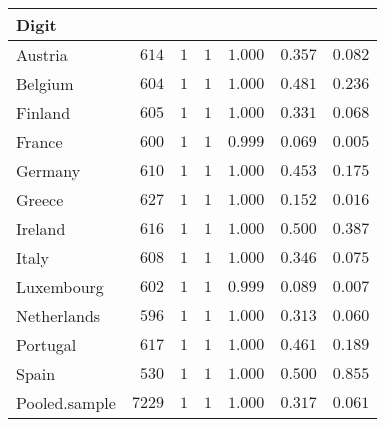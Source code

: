 \begin{table}[!tbp]
\begin{center}
\begin{tabular}{lrrrrrr}
\hline\hline
\multicolumn{1}{l}{Digit}&\multicolumn{1}{c}{}&\multicolumn{1}{c}{}&\multicolumn{1}{c}{}&\multicolumn{1}{c}{}&\multicolumn{1}{c}{}&\multicolumn{1}{c}{}\tabularnewline
\hline
Austria&$ 614$&$1$&$1$&$1.000$&$0.357$&$0.082$\tabularnewline
Belgium&$ 604$&$1$&$1$&$1.000$&$0.481$&$0.236$\tabularnewline
Finland&$ 605$&$1$&$1$&$1.000$&$0.331$&$0.068$\tabularnewline
France&$ 600$&$1$&$1$&$0.999$&$0.069$&$0.005$\tabularnewline
Germany&$ 610$&$1$&$1$&$1.000$&$0.453$&$0.175$\tabularnewline
Greece&$ 627$&$1$&$1$&$1.000$&$0.152$&$0.016$\tabularnewline
Ireland&$ 616$&$1$&$1$&$1.000$&$0.500$&$0.387$\tabularnewline
Italy&$ 608$&$1$&$1$&$1.000$&$0.346$&$0.075$\tabularnewline
Luxembourg&$ 602$&$1$&$1$&$0.999$&$0.089$&$0.007$\tabularnewline
Netherlands&$ 596$&$1$&$1$&$1.000$&$0.313$&$0.060$\tabularnewline
Portugal&$ 617$&$1$&$1$&$1.000$&$0.461$&$0.189$\tabularnewline
Spain&$ 530$&$1$&$1$&$1.000$&$0.500$&$0.855$\tabularnewline
Pooled.sample&$7229$&$1$&$1$&$1.000$&$0.317$&$0.061$\tabularnewline
\hline
\end{tabular}\end{center}
\end{table}
